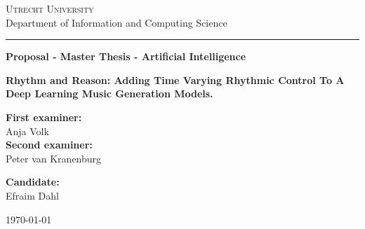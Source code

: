 
\begin{titlepage}

\begin{center}
{\scshape \Large
Utrecht University\\
}
\vspace{4mm}
{\Large
Department of Information and Computing Science
}
\vspace{8mm}
\hrule
\vspace{4mm}
\begin{spacing}{1.8}
{\large\textbf{
Proposal - Master Thesis - Artificial Intelligence
}}
\end{spacing}
\vspace{42mm}

\begin{spacing}{2.0}
{\Large \bf Rhythm and Reason: Adding Time Varying Rhythmic Control To A Deep Learning Music Generation Models.}
\\
\end{spacing}
\end{center}

\vfill
\noindent
\begin{minipage}[t]{0.5\textwidth}
\large
\textbf{First examiner:
}\\
Anja Volk\\
 \vspace{5mm}
\textbf{Second examiner:}\\
Peter van Kranenburg \\
\end{minipage}
\hfill
\begin{minipage}[t]{0.5\textwidth}\raggedleft
\large
\textbf{Candidate:}\\
Efraim Dahl\\
\end{minipage}

\vspace{24mm}

\begin{center}
\large \today
\end{center}

\end{titlepage}
\restoregeometry